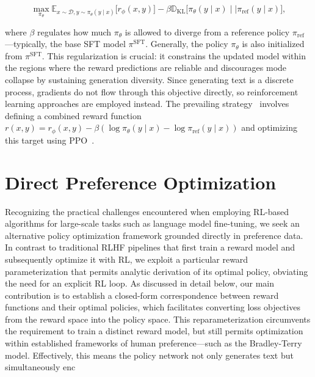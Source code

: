 \begin{equation}\label{eq:RL}
\max_{\pi_{\theta}}  \mathbb{E}_{x\sim \mathcal{D}, y\sim \pi_{\theta}(y \mid x)}\bigl[r_{\phi}(x, y)\bigr] - \beta\mathbb{D}_{\textrm{KL}}\bigl[\pi_{\theta}(y\mid x)\mid \mid \pi_\text{ref}(y\mid x)\bigr],
\end{equation}

where $\beta$ regulates how much $\pi_{\theta}$ is allowed to diverge from a reference policy $\pi_\text{ref}$—typically, the base SFT model $\pi^\text{SFT}$. Generally, the policy $\pi_\theta$ is also initialized from $\pi^\text{SFT}$. This regularization is crucial: it constrains the updated model within the regions where the reward predictions are reliable and discourages mode collapse by sustaining generation diversity. Since generating text is a discrete process, gradients do not flow through this objective directly, so reinforcement learning approaches are employed instead. The prevailing strategy~\cite{ziegler2020finetuning, stiennon2022learning, bai2022training, ouyang2022training} involves defining a combined reward function ${r(x, y) = r_{\phi}(x, y) -\beta (\log \pi_{\theta}(y\mid x) - \log \pi_\text{ref}(y\mid x))}$ and optimizing this target using PPO~\cite{schulman2017proximal}.

\section{Direct Preference Optimization}\label{sec:DPO}

Recognizing the practical challenges encountered when employing RL-based algorithms for large-scale tasks such as language model fine-tuning, we seek an alternative policy optimization framework grounded directly in preference data. In contrast to traditional RLHF pipelines that first train a reward model and subsequently optimize it with RL, we exploit a particular reward parameterization that permits analytic derivation of its optimal policy, obviating the need for an explicit RL loop. As discussed in detail below, our main contribution is to establish a closed-form correspondence between reward functions and their optimal policies, which facilitates converting loss objectives from the reward space into the policy space. This reparameterization circumvents the requirement to train a distinct reward model, but still permits optimization within established frameworks of human preference—such as the Bradley-Terry model. Effectively, this means the policy network not only generates text but simultaneously enc

